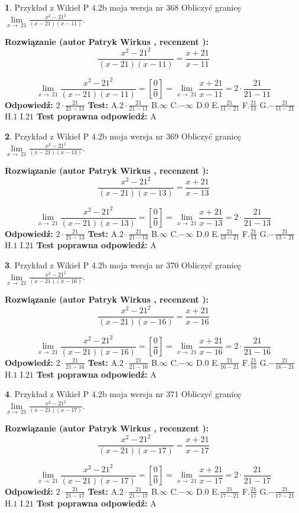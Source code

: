 \documentclass[12pt, a4paper]{article}
\theoremstyle{definition} %
\newtheorem{zad}{}
\newcommand{\zadStart}[1]{\begin{zad}#1\newline}
\newcommand{\zadStop}{\end{zad}}
\newcommand{\rozwStart}[2]{\noindent \textbf{Rozwiązanie (autor #1 , recenzent #2): }\newline}
\newcommand{\rozwStop}{\newline}
\newcommand{\odpStart}{\noindent \textbf{Odpowiedź:}\newline}
\newcommand{\odpStop}{\newline}
\newcommand{\testStart}{\noindent \textbf{Test:}\newline}
\newcommand{\testStop}{\newline}
\newcommand{\kluczStart}{\noindent \textbf{Test poprawna odpowiedź:}\newline}
\newcommand{\kluczStop}{\newline}
\begin{document}
\zadStart{Przykład z Wikieł P 4.2b moja wersja nr 368}
Obliczyć granicę $\lim\limits_{x\to\ 21}\frac{x^{2}-21^{2}}{(x-21)(x-11)}$.
\zadStop
\rozwStart{Patryk Wirkus}{}
$$\frac{x^{2}-21^{2}}{(x-21)(x-11)}=\frac{x+21}{x-11}$$

$$\lim\limits_{x\to\ 21}\frac{x^{2}-21^{2}}{(x-21)(x-11)}=[\frac{0}{0}]=\lim\limits_{x\to\ 21}\frac{x+21}{x-11}=2 \cdot \frac{21}{21-11}$$
\rozwStop
\odpStart
$2 \cdot \frac{21}{21-11}$
\odpStop
\testStart
A.$2 \cdot \frac{21}{21-11}$
B.$\infty$
C.$-\infty$
D.$0$
E.$\frac{21}{11-21}$
F.$\frac{21}{11}$
G.$-\frac{21}{11-21}$
H.$1$
I.$21$
\testStop
\kluczStart
A
\kluczStop



\zadStart{Przykład z Wikieł P 4.2b moja wersja nr 369}
Obliczyć granicę $\lim\limits_{x\to\ 21}\frac{x^{2}-21^{2}}{(x-21)(x-13)}$.
\zadStop
\rozwStart{Patryk Wirkus}{}
$$\frac{x^{2}-21^{2}}{(x-21)(x-13)}=\frac{x+21}{x-13}$$

$$\lim\limits_{x\to\ 21}\frac{x^{2}-21^{2}}{(x-21)(x-13)}=[\frac{0}{0}]=\lim\limits_{x\to\ 21}\frac{x+21}{x-13}=2 \cdot \frac{21}{21-13}$$
\rozwStop
\odpStart
$2 \cdot \frac{21}{21-13}$
\odpStop
\testStart
A.$2 \cdot \frac{21}{21-13}$
B.$\infty$
C.$-\infty$
D.$0$
E.$\frac{21}{13-21}$
F.$\frac{21}{13}$
G.$-\frac{21}{13-21}$
H.$1$
I.$21$
\testStop
\kluczStart
A
\kluczStop



\zadStart{Przykład z Wikieł P 4.2b moja wersja nr 370}
Obliczyć granicę $\lim\limits_{x\to\ 21}\frac{x^{2}-21^{2}}{(x-21)(x-16)}$.
\zadStop
\rozwStart{Patryk Wirkus}{}
$$\frac{x^{2}-21^{2}}{(x-21)(x-16)}=\frac{x+21}{x-16}$$

$$\lim\limits_{x\to\ 21}\frac{x^{2}-21^{2}}{(x-21)(x-16)}=[\frac{0}{0}]=\lim\limits_{x\to\ 21}\frac{x+21}{x-16}=2 \cdot \frac{21}{21-16}$$
\rozwStop
\odpStart
$2 \cdot \frac{21}{21-16}$
\odpStop
\testStart
A.$2 \cdot \frac{21}{21-16}$
B.$\infty$
C.$-\infty$
D.$0$
E.$\frac{21}{16-21}$
F.$\frac{21}{16}$
G.$-\frac{21}{16-21}$
H.$1$
I.$21$
\testStop
\kluczStart
A
\kluczStop



\zadStart{Przykład z Wikieł P 4.2b moja wersja nr 371}
Obliczyć granicę $\lim\limits_{x\to\ 21}\frac{x^{2}-21^{2}}{(x-21)(x-17)}$.
\zadStop
\rozwStart{Patryk Wirkus}{}
$$\frac{x^{2}-21^{2}}{(x-21)(x-17)}=\frac{x+21}{x-17}$$

$$\lim\limits_{x\to\ 21}\frac{x^{2}-21^{2}}{(x-21)(x-17)}=[\frac{0}{0}]=\lim\limits_{x\to\ 21}\frac{x+21}{x-17}=2 \cdot \frac{21}{21-17}$$
\rozwStop
\odpStart
$2 \cdot \frac{21}{21-17}$
\odpStop
\testStart
A.$2 \cdot \frac{21}{21-17}$
B.$\infty$
C.$-\infty$
D.$0$
E.$\frac{21}{17-21}$
F.$\frac{21}{17}$
G.$-\frac{21}{17-21}$
H.$1$
I.$21$
\testStop
\kluczStart
A
\kluczStop
\end{document}
